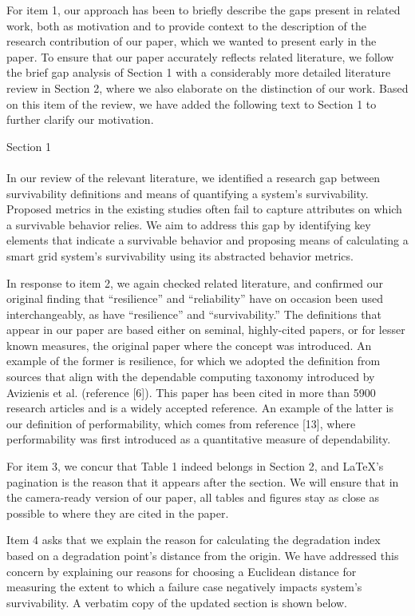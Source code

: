 \documentclass{article}
\newenvironment{response}{
  \doublespacing
  \setlength\parindent{0.05\linewidth}
  \ttfamily
}{}
\newenvironment{textblock}[1]
{\begin{tcolorbox}[breakable,enhanced]{#1 \\ \\}}
{\end{tcolorbox}}
\begin{document}
\begin{response}

For item 1, our approach has been to briefly describe the gaps present in related work, both as motivation and to provide context to the description of the research contribution of our paper, which we wanted to present early in the paper. To ensure that our paper accurately reflects related literature, we follow the brief gap analysis of Section 1 with a considerably more detailed literature review in Section 2, where we also elaborate on the distinction of our work. Based on this item of the review, we have added the following text to Section 1 to further clarify our motivation. 

\begin{textblock}{Section 1}
In our review of the relevant literature, we identified a research gap between survivability definitions and means of quantifying a system's survivability. Proposed metrics in the existing studies often fail to capture attributes on which a survivable behavior relies. We aim to address this gap by identifying key elements that indicate a survivable behavior and proposing means of calculating a smart grid system's survivability using its abstracted behavior metrics.
\end{textblock}

In response to item 2, we again checked related literature, and confirmed our original finding that ``resilience'' and ``reliability'' have on occasion been used interchangeably, as have ``resilience'' and ``survivability.'' The definitions that appear in our paper are based either on seminal, highly-cited papers, or for lesser known measures, the original paper where the concept was introduced. An example of the former is resilience, for which we adopted the definition from sources that align with the dependable computing taxonomy introduced by Avizienis et al. (reference [6]). This paper has been cited in more than 5900 research articles and is a widely accepted reference. An example of the latter is our definition of performability, which comes from reference [13], where performability  was first introduced as a quantitative measure of dependability. 

For item 3, we concur that Table 1 indeed belongs in Section 2, and LaTeX's pagination is the reason that it appears after the section. We will ensure that in the camera-ready version of our paper, all tables and figures stay as close as possible to where they are cited in the paper.

Item 4 asks that we explain the reason for calculating  the degradation index based on a degradation point's distance from the origin. We have addressed this concern by explaining our reasons for choosing a Euclidean distance for measuring the extent to which a failure case negatively impacts system's survivability. A verbatim copy of the updated section is shown below.


\end{response}
\end{document}
